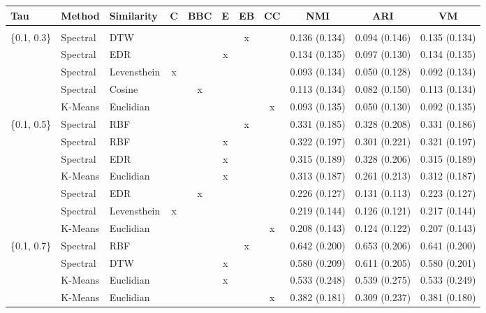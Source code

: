 \documentclass[12pt,a4paper,bibliography=totocnumbered,listof=totocnumbered]{scrartcl}
\begin{document}
\begin{appendix}
\begin{table}[!htbp] \centering 
	\label{} 
	\scriptsize
		\begin{tabularx}{\textwidth}{ lllcccccccc} \\
			\toprule
			Tau & Method & Similarity & C & BBC & E & EB & CC & NMI & ARI & VM \\ 
			\hline \\[-1.8ex] 
		\{0.1, 0.3\} & Spectral & DTW &  &  &  & x &  & 0.136 (0.134) & 0.094 (0.146) & 0.135 (0.134) \\ 
		& Spectral & EDR &  &  & x &  &  & 0.134 (0.135) & 0.097 (0.130) & 0.134 (0.135) \\ 
		& Spectral & Levensthein & x &  &  &  &  & 0.093 (0.134) & 0.050 (0.128) & 0.092 (0.134) \\ 
		& Spectral & Cosine &  & x &  &  &  & 0.113 (0.134) & 0.082 (0.150) & 0.113 (0.134) \\ 
		& K-Means & Euclidian &  &  &  &  & x & 0.093 (0.135) & 0.050 (0.130) & 0.092 (0.135) \\ 
		\{0.1, 0.5\} & Spectral & RBF &  &  &  & x &  & 0.331 (0.185) & 0.328 (0.208) & 0.331 (0.186) \\ 
		& Spectral & RBF &  &  & x &  &  & 0.322 (0.197) & 0.301 (0.221) & 0.321 (0.197) \\ 
		& Spectral & EDR &  &  & x &  &  & 0.315 (0.189) & 0.328 (0.206) & 0.315 (0.189) \\ 
		& K-Means & Euclidian &  &  & x &  &  & 0.313 (0.187) & 0.261 (0.213) & 0.312 (0.187) \\ 
		& Spectral & EDR &  & x &  &  &  & 0.226 (0.127) & 0.131 (0.113) & 0.223 (0.127) \\ 
		& Spectral & Levensthein & x &  &  &  &  & 0.219 (0.144) & 0.126 (0.121) & 0.217 (0.144) \\ 
		& K-Means & Euclidian &  &  &  &  & x & 0.208 (0.143) & 0.124 (0.122) & 0.207 (0.143) \\ 
		\{0.1, 0.7\} & Spectral & RBF &  &  &  & x &  & 0.642 (0.200) & 0.653 (0.206) & 0.641 (0.200) \\ 
		& Spectral & DTW &  &  & x &  &  & 0.580 (0.209) & 0.611 (0.205) & 0.580 (0.201) \\ 
		& K-Means & Euclidian &  &  & x &  &  & 0.533 (0.248) & 0.539 (0.275) & 0.533 (0.249) \\ 
		& K-Means & Euclidian &  &  &  &  & x & 0.382 (0.181) & 0.309 (0.237) & 0.381 (0.180) \\ 

\end{tabularx}
\end{table}
\end{appendix}
\end{document}

